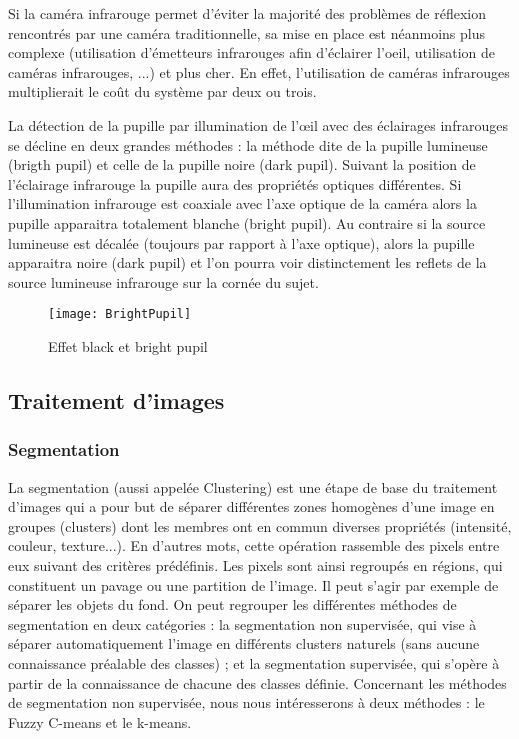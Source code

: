 Si la caméra infrarouge permet d’éviter la majorité des problèmes de réflexion rencontrés par une caméra traditionnelle, sa mise en place est néanmoins plus complexe (utilisation d’émetteurs infrarouges afin d'éclairer l'oeil, utilisation de caméras infrarouges, ...) et plus cher. En effet, l'utilisation de caméras infrarouges multiplierait le coût du système par deux ou trois.

La détection de la pupille par illumination de l’œil avec des éclairages infrarouges se décline en deux grandes méthodes : la méthode dite de la pupille lumineuse (brigth pupil) et celle de la pupille noire (dark pupil). Suivant la position de l’éclairage infrarouge la pupille aura des propriétés optiques différentes. Si l’illumination infrarouge est coaxiale avec l’axe optique de la caméra alors la pupille apparaitra totalement blanche (bright pupil). Au contraire si la source lumineuse est décalée (toujours par rapport à l’axe optique), alors la pupille apparaitra noire (dark pupil) et l’on pourra voir distinctement les reflets de la source lumineuse infrarouge sur la cornée du sujet.

\begin{figure}[H]
  \centering
  \texttt{[image: BrightPupil]}
  \caption{Effet black et bright pupil}
  \label{fig:BrightPupil}
\end{figure}

\subsection{Traitement d’images}

\subsubsection{Segmentation}

La segmentation (aussi appelée Clustering) \cite{d2004etude} est une étape de base du traitement d’images qui a pour but de séparer différentes zones homogènes d’une image en groupes (clusters) dont les membres ont en commun diverses propriétés (intensité, couleur, texture...). En d’autres mots, cette opération rassemble des pixels entre eux suivant des critères prédéfinis. Les pixels sont ainsi regroupés en régions, qui constituent un pavage ou une partition de l'image. Il peut s'agir par exemple de séparer les objets du fond. On peut regrouper les différentes méthodes de segmentation en deux catégories : la segmentation non supervisée, qui vise à séparer automatiquement l’image en différents clusters naturels (sans aucune connaissance préalable des classes) ; et la segmentation supervisée, qui s’opère à partir de la connaissance de chacune des classes définie. Concernant les méthodes de segmentation non supervisée, nous nous intéresserons à deux méthodes : le Fuzzy C-means et le k-means. 

